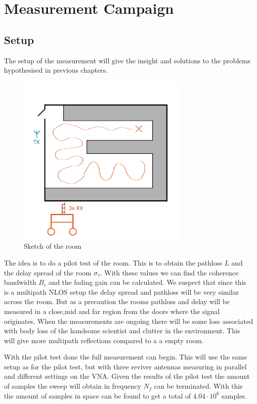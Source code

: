 \chapter{Measurement Campaign}
\section{Setup}
The setup of the measurement will give the insight and solutions to the problems hypothesised in previous chapters. 

\begin{figure}[H]
\centering
\includegraphics[width=0.75\textwidth]{figures/Gimp_figures/MeasSetup.png}
\caption{Sketch of the room}
\label{room sketch}
\end{figure}

The idea is to do a pilot test of the room. This is to obtain the pathloss $L$ and the delay spread of the room $\sigma_\tau$. With these values we can find the coherence bandwidth $B_c$ and the fading gain can be calculated. 
We suspect that since this is a multipath NLOS setup the delay spread and pathloss will be very similar across the room. But as a precaution the rooms pathloss and delay will be measured in a close,mid and far region from the doors where the signal originates. When the measurements are ongoing there will be some loss associated with body loss of the handsome scientist and clutter in the environment. This will give more multipath reflections compared to a a empty room.

With the pilot test done the full measurement can begin. This will use the same setup as for the pilot test, but with three reviver antennas measuring in parallel and different settings on the VNA. Given the results of the pilot test the amount of samples the sweep will obtain in frequency $N_f$ can be terminated. With this the amount of samples in space can be found to get a total of $4.04 \cdot 10^6$ samples.



